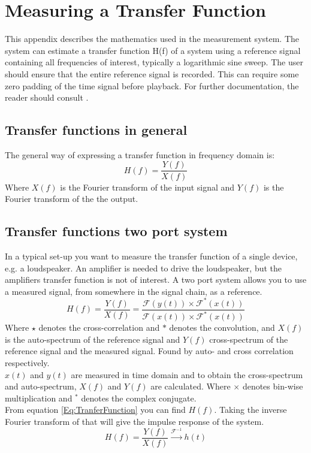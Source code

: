 \section{Measuring a Transfer Function}\label{Sec:MeasATransFunc}
This appendix describes the mathematics used in the measurement system. The system can estimate a transfer function H(f) of a system using a reference signal containing all frequencies of interest, typically  a logarithmic sine sweep. The user should ensure that the entire reference signal is recorded. This can require some zero padding of the time signal before playback. For further documentation, the reader should consult \cite{TutorialMeasurementPowerSpectra}.
\subsection{Transfer functions in general}
The general way of expressing a transfer function in frequency domain is:
\begin{equation}
H(f)=\frac{Y(f)}{X(f)}
\label{Eq:TranferFunction}
\end{equation}
Where $X(f)$ is the Fourier transform of the input signal and $Y(f)$ is the Fourier transform of the the output.  

\subsection{Transfer functions two port system}
In a typical set-up you want to measure the transfer function of a single device, e.g. a loudspeaker. An amplifier is needed to drive the loudspeaker, but the amplifiers transfer function is not of interest. A two port system allows you to use a measured signal, from somewhere in the signal chain, as a reference. 
\begin{equation}
H(f)=\frac{Y(f)}{X(f)}=\frac{\mathscr{F}(y(t))\times\mathscr{F}^{\ast}(x(t))}{\mathscr{F}(x(t))\times\mathscr{F}^{\ast}(x(t))}
\label{Eq:TranferFunctionTwoPort}
\end{equation}
Where $\star $ denotes the cross-correlation and $\ast $ denotes the convolution, and 
 $X(f)$ is the auto-spectrum of the reference signal and $Y(f)$ cross-spectrum of the reference signal and the measured signal. Found by auto- and cross correlation respectively.\\
$x(t)$ and $y(t)$ are measured in time domain and to obtain the cross-spectrum and auto-spectrum, $X(f)$ and $Y(f)$ are calculated.
Where $\times$ denotes bin-wise multiplication and $^{\ast}$ denotes the complex conjugate. \\
From equation \ref{Eq:TranferFunction} %
you can find $H(f)$. Taking the inverse Fourier transform of that will give the impulse response of the system. 
\begin{equation}
H(f) = \frac{Y(f)}{X(f)} \xrightarrow{\mathscr{F}^{-1}} h(t)
\label{Eq:Impulseresponse}
\end{equation} 

